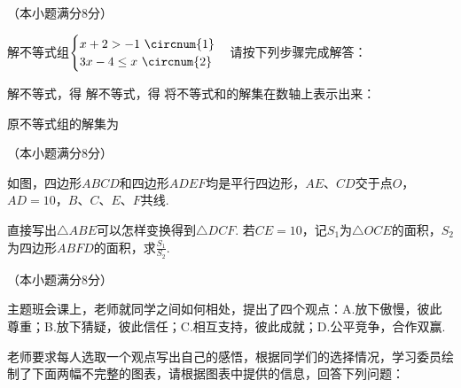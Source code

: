\documentclass[10pt]{article}
\begin{document}
\begin{questions}{\answeringintroduction}
    \question （本小题满分8分）\par
    解不等式组$\begin{cases}
        x+2 > -1 \ \text{\circnum{1}} \\
        3x-4 \leq x \ \text{\circnum{2}}
    \end{cases}$请按下列步骤完成解答：
    \begin{subquestions}
        \rmsubquestion 解不等式，得\complitingline
        \rmsubquestion 解不等式，得\complitingline
        \rmsubquestion 将不等式和的解集在数轴上表示出来：
        \addemptyline
        \begin{figure}[!htb]
            \centering
        \end{figure}
        \rmsubquestion 原不等式组的解集为\complitingline
    \end{subquestions}
    \question （本小题满分8分）\par
    如图，四边形$ABCD$和四边形$ADEF$均是平行四边形，$AE$、$CD$交于点$O$，$AD=10$，$B$、$C$、$E$、$F$共线.
    \begin{subquestions}
        \subquestion 直接写出$\triangle ABE$可以怎样变换得到$\triangle DCF$.
        \subquestion 若$CE=10$，记$S_1$为$\triangle OCE$的面积，$S_2$为四边形$ABFD$的面积，求$\frac{S_1}{S_2}$.
    \end{subquestions}
    \question （本小题满分8分）\par
    主题班会课上，老师就同学之间如何相处，提出了四个观点：A.放下傲慢，彼此尊重；B.放下猜疑，彼此信任；C.相互支持，彼此成就；D.公平竞争，合作双赢. \par
    \qquad 老师要求每人选取一个观点写出自己的感悟，根据同学们的选择情况，学习委员绘制了下面两幅不完整的图表，请根据图表中提供的信息，回答下列问题：

\end{questions}
\end{document}
